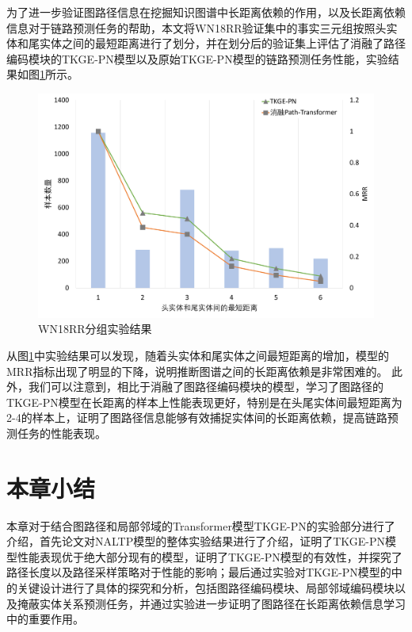 为了进一步验证图路径信息在挖掘知识图谱中长距离依赖的作用，以及长距离依赖信息对于链路预测任务的帮助，本文将WN18RR验证集中的事实三元组按照头实体和尾实体之间的最短距离进行了划分，并在划分后的验证集上评估了消融了路径编码模块的TKGE-PN模型以及原始TKGE-PN模型的链路预测任务性能，实验结果如图\ref{tkge_experiment}所示。

\begin{figure}[htb]
    \centerline{\includegraphics[width=1\textwidth]{pic/TKGE-PN_experiment.pdf}}
    \caption{WN18RR分组实验结果}
    \label{tkge_experiment}
  \end{figure}

从图\ref{tkge_experiment}中实验结果可以发现，随着头实体和尾实体之间最短距离的增加，模型的MRR指标出现了明显的下降，说明推断图谱之间的长距离依赖是非常困难的。 此外，我们可以注意到，相比于消融了图路径编码模块的模型，学习了图路径的TKGE-PN模型在长距离的样本上性能表现更好，特别是在头尾实体间最短距离为2-4的样本上，证明了图路径信息能够有效捕捉实体间的长距离依赖，提高链路预测任务的性能表现。

\section{本章小结}

本章对于结合图路径和局部邻域的Transformer模型TKGE-PN的实验部分进行了介绍，首先论文对NALTP模型的整体实验结果进行了介绍，证明了TKGE-PN模型性能表现优于绝大部分现有的模型，证明了TKGE-PN模型的有效性，并探究了路径长度以及路径采样策略对于性能的影响；最后通过实验对TKGE-PN模型的中的关键设计进行了具体的探究和分析，包括图路径编码模块、局部邻域编码模块以及掩蔽实体关系预测任务，并通过实验进一步证明了图路径在长距离依赖信息学习中的重要作用。